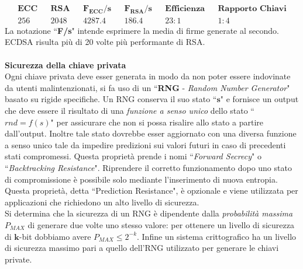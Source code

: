 \documentclass[a4paper,12pt]{tesiinfo}
\begin{document}
\begin{align*}
 &\textbf{ECC}& &\textbf{RSA}& &\textbf{$\mathbold{F_{ECC}}$/s}& &\textbf{$\mathbold{F_{RSA}}$/s}& &\textbf{Efficienza}& &\textbf{Rapporto Chiavi}&\\
 &256& &2048& &4287.4& &186.4& &23:1& &1:4&
\end{align*}
La notazione ``\textbf{F/s}" intende esprimere la media di firme generate al secondo.\\
ECDSA risulta pi\`u di 20 volte pi\`u performante di RSA.
\\
\\
\textbf{Sicurezza della chiave privata}
\\
Ogni chiave privata deve esser generata in modo da non poter essere indovinate da utenti malintenzionati, si fa uso di un ``\textbf{RNG} - \textit{Random Number Generator}" basato su rigide specifiche. Un RNG conserva il suo stato ``$\mathbold{s}$" e fornisce un output che deve essere il risultato di una \textit{funzione a senso unico} dello stato ``${rnd = f(s)}$" per assicurare che non si possa risalire allo stato a partire dall'output. Inoltre tale stato dovrebbe esser aggiornato con una diversa funzione a senso unico tale da impedire predizioni sui valori futuri in caso di precedenti stati compromessi. Questa propriet\`a prende i nomi ``\textit{Forward Secrecy}" o ``\textit{Backtracking Resistance}". Riprendere il corretto funzionamento dopo uno stato di compromissione \`e possibile solo mediante l'inserimento di nuova entropia. Questa propriet\`a, detta ``Prediction Resistance", \`e opzionale e viene utilizzata per applicazioni che richiedono un alto livello di sicurezza.
\\
Si determina che la sicurezza di un RNG \`e dipendente dalla \textit{probabilit\`a massima} ${P_{MAX}}$ di generare due volte uno stesso valore: per ottenere un livello di sicurezza di $\mathbold{k}$-bit dobbiamo avere $P_{MAX} \leq 2^{-k}$.
Infine un sistema crittografico ha un livello di sicurezza massimo pari a quello dell'RNG utilizzato per generare le chiavi private.
\\
\end{document}
